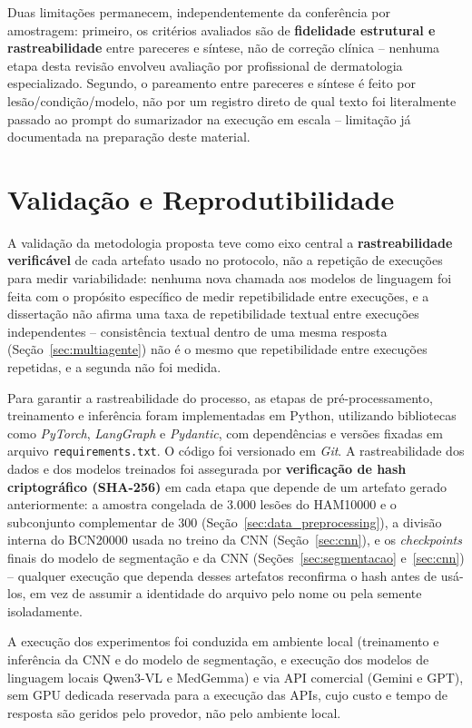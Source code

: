 Duas limitações permanecem, independentemente da conferência por amostragem: primeiro, os critérios avaliados são de \textbf{fidelidade estrutural e rastreabilidade} entre pareceres e síntese, não de correção clínica -- nenhuma etapa desta revisão envolveu avaliação por profissional de dermatologia especializado. Segundo, o pareamento entre pareceres e síntese é feito por lesão/condição/modelo, não por um registro direto de qual texto foi literalmente passado ao prompt do sumarizador na execução em escala -- limitação já documentada na preparação deste material.

\section{Validação e Reprodutibilidade}
\label{sec:validacao_reprodutibilidade}

A validação da metodologia proposta teve como eixo central a \textbf{rastreabilidade verificável} de cada artefato usado no protocolo, não a repetição de execuções para medir variabilidade: nenhuma nova chamada aos modelos de linguagem foi feita com o propósito específico de medir repetibilidade entre execuções, e a dissertação não afirma uma taxa de repetibilidade textual entre execuções independentes -- consistência textual dentro de uma mesma resposta (Seção~\ref{sec:multiagente}) não é o mesmo que repetibilidade entre execuções repetidas, e a segunda não foi medida.

Para garantir a rastreabilidade do processo, as etapas de pré-processamento, treinamento e inferência foram implementadas em Python, utilizando bibliotecas como \textit{PyTorch}, \textit{LangGraph} e \textit{Pydantic}, com dependências e versões fixadas em arquivo \texttt{requirements.txt}. O código foi versionado em \textit{Git}. A rastreabilidade dos dados e dos modelos treinados foi assegurada por \textbf{verificação de hash criptográfico (SHA-256)} em cada etapa que depende de um artefato gerado anteriormente: a amostra congelada de 3.000 lesões do HAM10000 e o subconjunto complementar de 300 (Seção~\ref{sec:data_preprocessing}), a divisão interna do BCN20000 usada no treino da CNN (Seção~\ref{sec:cnn}), e os \textit{checkpoints} finais do modelo de segmentação e da CNN (Seções~\ref{sec:segmentacao} e~\ref{sec:cnn}) -- qualquer execução que dependa desses artefatos reconfirma o hash antes de usá-los, em vez de assumir a identidade do arquivo pelo nome ou pela semente isoladamente.

A execução dos experimentos foi conduzida em ambiente local (treinamento e inferência da CNN e do modelo de segmentação, e execução dos modelos de linguagem locais Qwen3-VL e MedGemma) e via API comercial (Gemini e GPT), sem GPU dedicada reservada para a execução das APIs, cujo custo e tempo de resposta são geridos pelo provedor, não pelo ambiente local.

